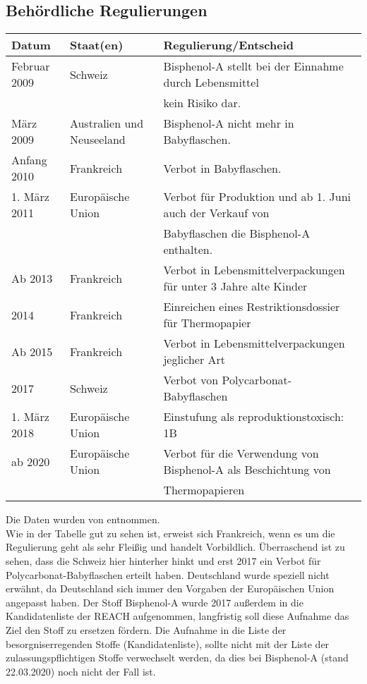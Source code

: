 \subsection{Behördliche Regulierungen}
\begin{tabular} [h]{l|l|l}
Datum & Staat(en) & Regulierung/Entscheid\\
\hline
Februar 2009 & Schweiz & Bisphenol-A stellt bei der Einnahme durch Lebensmittel\\
& & kein Risiko dar. \\
\hline
März 2009 & Australien und Neuseeland & Bisphenol-A nicht mehr in Babyflaschen. \\
\hline
Anfang 2010 & Frankreich & Verbot in Babyflaschen.\\
\hline
1. März 2011 & Europäische Union & Verbot für Produktion und ab 1. Juni auch der Verkauf von\\ &&Babyflaschen die Bisphenol-A enthalten. \\
\hline
Ab 2013 & Frankreich & Verbot in Lebensmittelverpackungen für unter 3 Jahre alte Kinder \\
\hline
2014 & Frankreich & Einreichen eines Restriktionsdossier für Thermopapier \\
\hline
Ab 2015 & Frankreich & Verbot in Lebensmittelverpackungen jeglicher Art \\
\hline
2017 & Schweiz & Verbot von Polycarbonat-Babyflaschen\\
\hline
1. März 2018 & Europäische Union & Einstufung als reproduktionstoxisch: 1B \\
\hline
ab 2020 & Europäische Union & Verbot für die Verwendung von Bisphenol-A als Beschichtung von\\
&&Thermopapieren\\
\end{tabular}
Die Daten wurden von \cite{Wikipedia} entnommen.\\
Wie in der Tabelle gut zu sehen ist, erweist sich Frankreich, wenn es um die Regulierung geht als sehr Fleißig und handelt Vorbildlich. Überraschend ist zu sehen, dass die Schweiz hier hinterher hinkt und erst 2017 ein Verbot für Polycarbonat-Babyflaschen erteilt haben. Deutschland wurde speziell nicht erwähnt, da Deutschland sich immer den Vorgaben der Europäischen Union angepasst haben. Der Stoff Bisphenol-A wurde 2017 außerdem in die Kandidatenliste der REACH aufgenommen, langfristig soll diese Aufnahme das Ziel den Stoff zu ersetzen fördern. Die Aufnahme in die Liste der besorgniserregenden Stoffe (Kandidatenliste), sollte nicht mit der Liste der zulassungspflichtigen Stoffe verwechselt werden, da dies bei Bisphenol-A (stand 22.03.2020) noch nicht der Fall ist.


